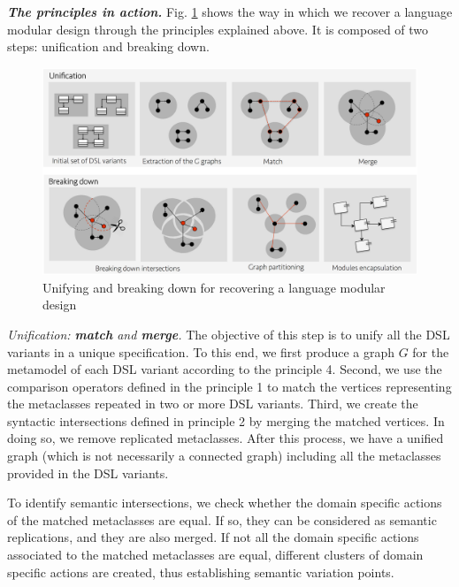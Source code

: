 \vspace{2mm}
\textbf{\textit{The principles in action.}} Fig. \ref{fig:breakingdown} shows the way in which we recover a language modular design through the principles explained above. It is composed of two steps: unification and breaking down.

\begin{figure}
\centering
\includegraphics[width=1\linewidth]{images/fig-reverse-engineering-detailed.png}
\caption{Unifying and breaking down for recovering a language modular design}
\label{fig:breakingdown}
\end{figure}

\vspace{2mm}
\textit{Unification: \textbf{match} and \textbf{merge}.} The objective of this step is to unify all the DSL variants in a unique specification. To this end, we first produce a graph $G$ for the metamodel of each DSL variant according to the principle 4. Second, we use the comparison operators defined in the principle 1 to match the vertices representing the metaclasses repeated in two or more DSL variants. Third, we create the syntactic intersections defined in principle 2 by merging the matched vertices. In doing so, we remove replicated metaclasses. After this process, we have a unified graph (which is not necessarily a connected graph) including all the metaclasses provided in the DSL variants. 

To identify semantic intersections, we check whether the domain specific actions of the matched metaclasses are equal. If so, they can be considered as semantic replications, and they are also merged. If not all the domain specific actions associated to the matched metaclasses are equal, different clusters of domain specific actions are created, thus establishing semantic variation points.

